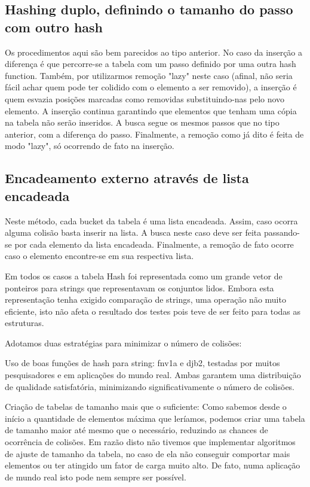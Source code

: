 \documentclass[twoside]{article}
\begin{document}
\begin{multicols}{2}
\subsection{ Hashing duplo, definindo o tamanho do passo com outro hash }
   Os procedimentos aqui são bem parecidos ao tipo anterior. No caso da inserção a diferença é que percorre-se a tabela com um passo definido por uma outra hash function. Também, por utilizarmos remoção "lazy" neste caso (afinal, não seria fácil achar quem pode ter colidido com o elemento a ser removido), a inserção é quem esvazia posições marcadas como removidas substituindo-nas pelo novo elemento. A inserção continua garantindo que elementos que tenham uma cópia na tabela não serão inseridos.
   A busca segue os mesmos passos que no tipo anterior, com a diferença do passo.
   Finalmente, a remoção como já dito é feita de modo "lazy", só ocorrendo de fato na inserção.

\subsection{ Encadeamento externo através de lista encadeada }
   Neste método, cada bucket da tabela é uma lista encadeada. Assim, caso ocorra alguma colisão basta inserir na lista. 
   A busca neste caso deve ser feita passando-se por cada elemento da lista encadeada.
   Finalmente, a remoção de fato ocorre caso o elemento encontre-se em sua respectiva lista.

Em todos os casos a tabela Hash foi representada como um grande vetor de ponteiros para strings que representavam os conjuntos lidos. Embora esta representação tenha exigido comparação de strings, uma operação não muito eficiente, isto não afeta o resultado dos testes pois teve de ser feito para todas as estruturas. 

Adotamos duas estratégias para minimizar o número de colisões:
\begin{compactitem}
\item Uso de boas funções de hash para string: 
   fnv1a e djb2, testadas por muitos pesquisadores e em aplicações do mundo real. Ambas garantem uma distribuição de qualidade satisfatória, minimizando significativamente o número de colisões.

\item Criação de tabelas de tamanho mais que o suficiente:
   Como sabemos desde o início a quantidade de elementos máxima que leríamos, podemos criar uma tabela de tamanho maior até mesmo que o necessário, reduzindo as chances de ocorrência de colisões. Em razão disto não tivemos que implementar algoritmos de ajuste de tamanho da tabela, no caso de ela não conseguir comportar mais elementos ou ter atingido um fator de carga muito alto. De fato, numa aplicação de mundo real isto pode nem sempre ser possível.
\end{compactitem}




\end{multicols}
\end{document}
